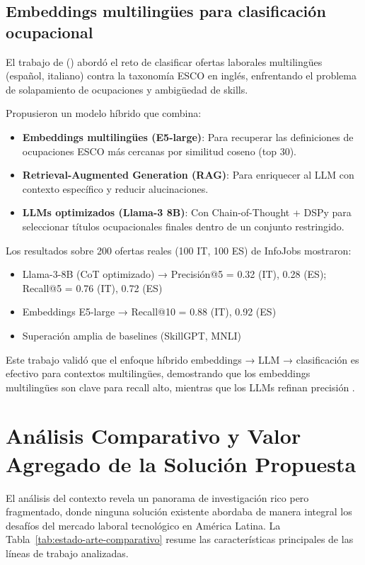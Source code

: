 \subsection{Embeddings multilingües para clasificación ocupacional}

El trabajo de \citeauthor{kavas2024} (\citeyear{kavas2024}) abordó el reto de clasificar ofertas laborales multilingües (español, italiano) contra la taxonomía ESCO en inglés, enfrentando el problema de solapamiento de ocupaciones y ambigüedad de skills.

Propusieron un modelo híbrido que combina:

\begin{itemize}
    \item \textbf{Embeddings multilingües (E5-large)}: Para recuperar las definiciones de ocupaciones ESCO más cercanas por similitud coseno (top 30).
    \item \textbf{Retrieval-Augmented Generation (RAG)}: Para enriquecer al LLM con contexto específico y reducir alucinaciones.
    \item \textbf{LLMs optimizados (Llama-3 8B)}: Con Chain-of-Thought + DSPy para seleccionar títulos ocupacionales finales dentro de un conjunto restringido.
\end{itemize}

Los resultados sobre 200 ofertas reales (100 IT, 100 ES) de InfoJobs mostraron:

\begin{itemize}
    \item Llama-3-8B (CoT optimizado) → Precisión@5 = 0.32 (IT), 0.28 (ES); Recall@5 = 0.76 (IT), 0.72 (ES)
    \item Embeddings E5-large → Recall@10 = 0.88 (IT), 0.92 (ES)
    \item Superación amplia de baselines (SkillGPT, MNLI) \cite{kavas2024}
\end{itemize}

Este trabajo validó que el enfoque híbrido embeddings → LLM → clasificación es efectivo para contextos multilingües, demostrando que los embeddings multilingües son clave para recall alto, mientras que los LLMs refinan precisión \cite{kavas2024}.

\section{Análisis Comparativo y Valor Agregado de la Solución Propuesta}

El análisis del contexto revela un panorama de investigación rico pero fragmentado, donde ninguna solución existente abordaba de manera integral los desafíos del mercado laboral tecnológico en América Latina. La Tabla~\ref{tab:estado-arte-comparativo} resume las características principales de las líneas de trabajo analizadas.


